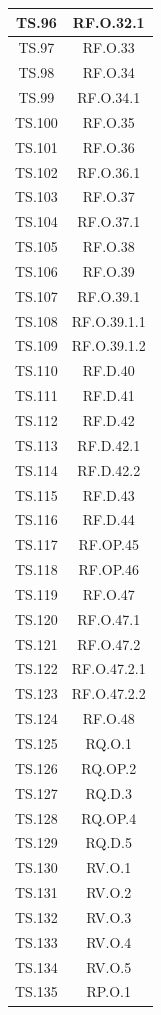 \begin{xltabular}{\textwidth}{|c|c|}
\hline
TS.96 & RF.O.32.1 \\
\hline
TS.97 & RF.O.33 \\
\hline
TS.98 & RF.O.34 \\
\hline
TS.99 & RF.O.34.1 \\
\hline
TS.100 & RF.O.35 \\
\hline
TS.101 & RF.O.36 \\
\hline
TS.102 & RF.O.36.1 \\
\hline
TS.103 & RF.O.37 \\
\hline
TS.104 & RF.O.37.1 \\
\hline
TS.105 & RF.O.38 \\
\hline
TS.106 & RF.O.39 \\
\hline
TS.107 & RF.O.39.1 \\
\hline
TS.108 & RF.O.39.1.1 \\
\hline
TS.109 & RF.O.39.1.2 \\
\hline
TS.110 & RF.D.40 \\
\hline
TS.111 & RF.D.41 \\
\hline
TS.112 & RF.D.42 \\
\hline
TS.113 & RF.D.42.1 \\
\hline
TS.114 & RF.D.42.2 \\
\hline
TS.115 & RF.D.43 \\
\hline
TS.116 & RF.D.44 \\
\hline
TS.117 & RF.OP.45 \\
\hline
TS.118 & RF.OP.46 \\
\hline
TS.119 & RF.O.47 \\
\hline
TS.120 & RF.O.47.1 \\
\hline
TS.121 & RF.O.47.2 \\
\hline
TS.122 & RF.O.47.2.1 \\
\hline
TS.123 & RF.O.47.2.2 \\
\hline
TS.124 & RF.O.48 \\
\hline
TS.125 & RQ.O.1 \\
\hline
TS.126 & RQ.OP.2 \\
\hline
TS.127 & RQ.D.3 \\
\hline
TS.128 & RQ.OP.4 \\
\hline
TS.129 & RQ.D.5 \\
\hline
TS.130 & RV.O.1 \\
\hline
TS.131 & RV.O.2 \\
\hline
TS.132 & RV.O.3 \\
\hline
TS.133 & RV.O.4 \\
\hline
TS.134 & RV.O.5 \\
\hline
TS.135 & RP.O.1 \\
\hline

\end{xltabular}

